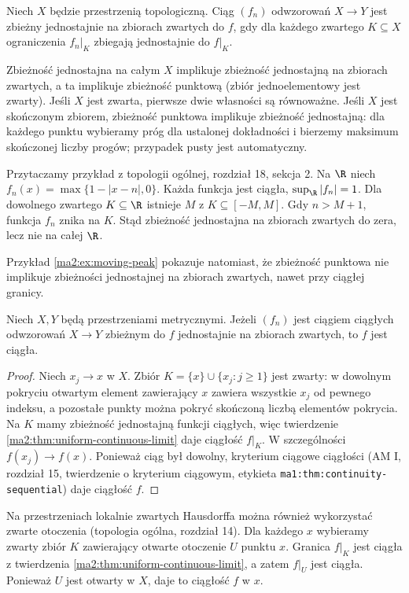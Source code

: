 \begin{definicja}
\label{ma2:def:compact-uniform}
Niech $X$ będzie przestrzenią topologiczną.
Ciąg $(f_n)$ odwzorowań $X\to Y$ jest zbieżny
jednostajnie na zbiorach zwartych do $f$,
gdy dla każdego zwartego $K\subseteq X$
ograniczenia $f_n|_K$ zbiegają jednostajnie do $f|_K$.
\end{definicja}
Zbieżność jednostajna na całym $X$ implikuje
zbieżność jednostajną na zbiorach zwartych,
a ta implikuje zbieżność punktową (zbiór
jednoelementowy jest zwarty). Jeśli $X$ jest
zwarta, pierwsze dwie własności są równoważne.
Jeśli $X$ jest skończonym zbiorem, zbieżność
punktowa implikuje zbieżność jednostajną:
dla każdego punktu wybieramy próg dla ustalonej
dokładności i bierzemy maksimum skończonej
liczby progów; przypadek pusty jest automatyczny.

\begin{przyklad}
\label{ex:topog-odwzorowania-gorki-uciekajace}
Przytaczamy przykład z topologii ogólnej, rozdział 18,
sekcja 2. Na $\R$ niech
$f_n(x)=\max\{1-|x-n|,0\}$.
Każda funkcja jest ciągła, $\sup_{\R}|f_n|=1$.
Dla dowolnego zwartego $K\subseteq\R$ istnieje $M$
z $K\subseteq[-M,M]$. Gdy $n>M+1$, funkcja
$f_n$ znika na $K$. Stąd zbieżność jednostajna
na zbiorach zwartych do zera, lecz nie na całej $\R$.
\end{przyklad}
Przykład \ref{ma2:ex:moving-peak} pokazuje natomiast,
że zbieżność punktowa nie implikuje zbieżności
jednostajnej na zbiorach zwartych, nawet przy
ciągłej granicy.

\begin{twierdzenie}
\label{ma2:thm:compact-uniform-continuity}
Niech $X,Y$ będą przestrzeniami metrycznymi.
Jeżeli $(f_n)$ jest ciągiem ciągłych odwzorowań
$X\to Y$ zbieżnym do $f$ jednostajnie na zbiorach
zwartych, to $f$ jest ciągła.
\end{twierdzenie}
\begin{proof}
Niech $x_j\to x$ w $X$. Zbiór
$K=\{x\}\cup\{x_j:j\ge1\}$ jest zwarty:
w dowolnym pokryciu otwartym element zawierający
$x$ zawiera wszystkie $x_j$ od pewnego indeksu,
a pozostałe punkty można pokryć skończoną liczbą
elementów pokrycia. Na $K$ mamy zbieżność
jednostajną funkcji ciągłych, więc
twierdzenie \ref{ma2:thm:uniform-continuous-limit}
daje ciągłość $f|_K$. W szczególności
$f(x_j)\to f(x)$. Ponieważ ciąg był dowolny,
kryterium ciągowe ciągłości (AM I, rozdział 15,
twierdzenie o kryterium ciągowym, etykieta
\texttt{ma1:thm:continuity-sequential}) daje ciągłość $f$.
\end{proof}
Na przestrzeniach lokalnie zwartych Hausdorffa
można również wykorzystać zwarte otoczenia
(topologia ogólna, rozdział 14). Dla każdego $x$
wybieramy zwarty zbiór $K$ zawierający otwarte
otoczenie $U$ punktu $x$. Granica $f|_K$ jest
ciągła z twierdzenia \ref{ma2:thm:uniform-continuous-limit},
a zatem $f|_U$ jest ciągła. Ponieważ $U$ jest
otwarty w $X$, daje to ciągłość $f$ w $x$.

